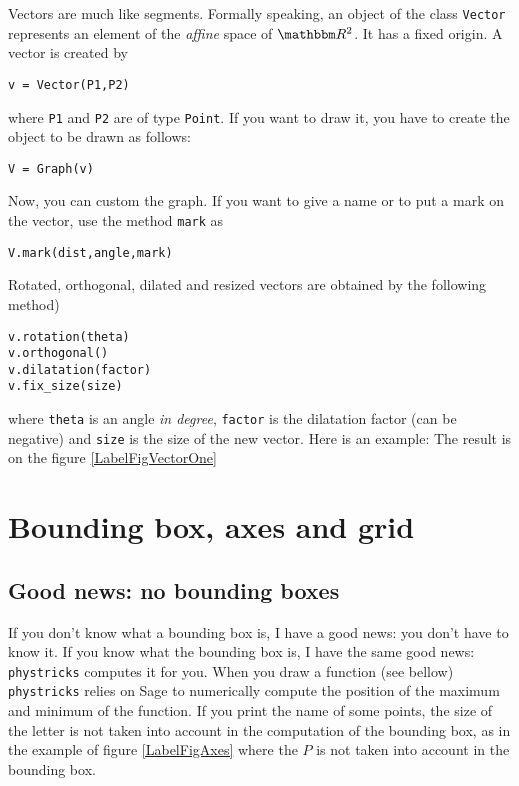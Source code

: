 Vectors are much like segments. Formally speaking, an object of the class \verb+Vector+ represents an element of the \emph{affine} space of $\eR^2$. It has a fixed origin. A vector is created by
\begin{verbatim}
v = Vector(P1,P2)
\end{verbatim}
where \verb+P1+ and \verb+P2+ are of type \verb+Point+. If you want to draw it, you have to create the object to be drawn as follows:
\begin{verbatim}
V = Graph(v)
\end{verbatim}
Now, you can custom the graph. If you want to give a name or to put a mark on the vector, use the method \verb+mark+ as
\begin{verbatim}
V.mark(dist,angle,mark)
\end{verbatim}
Rotated, orthogonal, dilated and resized vectors are obtained by the following method)
\begin{verbatim}
v.rotation(theta)
v.orthogonal()
v.dilatation(factor)
v.fix_size(size)
\end{verbatim}
where \verb+theta+ is an angle \emph{in degree}, \verb+factor+ is the dilatation factor (can be negative) and \verb+size+ is the size of the new vector. 
Here is an example:
The result is on the figure \ref{LabelFigVectorOne}
\newcommand{\CaptionFigVectorOne}{Some examples of vectors.}


\section{Bounding box, axes and grid}

\subsection{Good news: no bounding boxes}

If you don't know what a bounding box is, I have a good news: you don't have to know it. If you know what the bounding box is, I have the same good news: \verb+phystricks+ computes it for you. When you draw a function (see bellow) \verb+phystricks+ relies on Sage to numerically compute the position of the maximum and minimum of the function. If you print the name of some points, the size of the letter is not taken into account in the computation of the bounding box, as in the example of figure \ref{LabelFigAxes} where the $P$ is not taken into account in the bounding box. 

